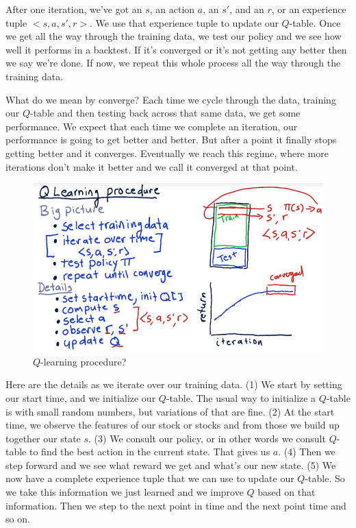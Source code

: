 \documentclass[12pt]{article}
\begin{document}
After one iteration, we've got an $s$, an action $a$, an $s'$, and an $r$, or an experience tuple $<s, a, s', r>$. We use that experience tuple to update our $Q$-table. Once we get all the way through the training data, we test our policy and we see how well it performs in a backtest. If it's converged or it's not getting any better then we say we're done. If now, we repeat this whole process all the way through the training data. 

What do we mean by converge? Each time we cycle through the data, training our $Q$-table and then testing back across that same data, we get some performance. We expect that each time we complete an iteration, our performance is going to get better and better. But after a point it finally stops getting better and it converges. Eventually we reach this regime, where more iterations don't make it better and we call it converged at that point. 

\begin{figure}[!ht]
\centering
\includegraphics[scale=0.4]{fig/fig105}
\caption{$Q$-learning procedure?}
\end{figure}

Here are the details as we iterate over our training data. (1) We start by setting our start time, and we initialize our $Q$-table. The usual way to initialize a $Q$-table is with small random numbers, but variations of that are fine. (2) At the start time, we observe the features of our stock or stocks and from those we build up together our state $s$. (3) We consult our policy, or in other words we consult $Q$-table to find the best action in the current state. That gives us $a$. (4) Then we step forward and we see what reward we get and what's our new state. (5) We now have a complete experience tuple that we can use to update our $Q$-table. So we take this information we just learned and we improve $Q$ based on that information. Then we step to the next point in time and the next point time and so on. 
\end{document}
